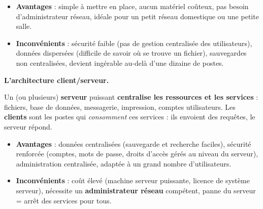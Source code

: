 \documentclass[11pt]{article}
\begin{document}
\begin{itemize}
  \item \textbf{Avantages} : simple à mettre en place, aucun matériel coûteux, pas besoin d'administrateur réseau, idéale pour un petit réseau domestique ou une petite salle.
  \item \textbf{Inconvénients} : sécurité faible (pas de gestion centralisée des utilisateurs), données dispersées (difficile de savoir où se trouve un fichier), sauvegardes non centralisées, devient ingérable au-delà d'une dizaine de postes.
\end{itemize}

\textbf{L'architecture client/serveur.}\par
Un (ou plusieurs) \textbf{serveur} puissant \textbf{centralise les ressources et les services} : fichiers, base de données, messagerie, impression, comptes utilisateurs. Les \textbf{clients} sont les postes qui \emph{consomment} ces services : ils envoient des requêtes, le serveur répond.

\begin{itemize}
  \item \textbf{Avantages} : données centralisées (sauvegarde et recherche faciles), sécurité renforcée (comptes, mots de passe, droits d'accès gérés au niveau du serveur), administration centralisée, adaptée à un grand nombre d'utilisateurs.
  \item \textbf{Inconvénients} : coût élevé (machine serveur puissante, licence de système serveur), nécessite un \textbf{administrateur réseau} compétent, panne du serveur = arrêt des services pour tous.
\end{itemize}
\end{document}
